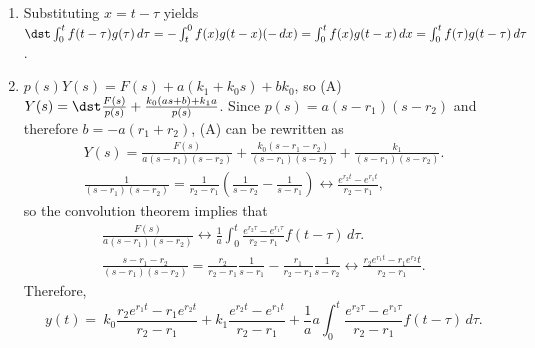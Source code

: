 \documentclass[openany]{book}
\newenvironment{sectionSolutions}{
 \begin{enumerate}[item-label={\thesection.\arabic{enumi}.}]
}{
 \end{enumerate}
}
\begin{document}
\begin{sectionSolutions}

\item Substituting $x=t-\tau$ yields
$\dst\int_0^tf(t-\tau)g(\tau)\,d\tau=-\int_t^0f(x)g(t-x)(-\,dx)=
\int_0^tf(x)g(t-x)\,dx=\int_0^tf(\tau)g(t-\tau)\,d\tau$.


\item
$p(s)Y(s)=F(s)+a(k_1+k_0s)+bk_0$, so
(A) $Y(s)=\dst\frac{F(s)}{ p(s)}+\frac{k_0(as+b)+k_1a}{ p(s)}$.
Since $p(s)=a(s-r_1)(s-r_2)$ and therefore $b=-a(r_1+r_2)$,
(A) can be rewritten as
\begin{gather*}
Y(s)=\frac{F(s)}{ a(s-r_1)(s-r_2)}+\frac{k_0(s-r_1-r_2)}{(s-r_1)(s-r_2)}
+\frac{k_1}{(s-r_1)(s-r_2)}.
\\
\frac{1}{(s-r_1)(s-r_2)}=\frac{1}{ r_2-r_1}\left(\frac{1}{ s-r_2}
-\frac{1}{ s-r_1}\right)\leftrightarrow\frac{e^{r_2t}-e^{r_1t}}{
r_2-r_1},
\end{gather*}
so the convolution theorem implies that
\begin{gather*}
\frac{F(s)}{ a(s-r_1)(s-r_2)}\leftrightarrow
\frac{1}{
a}\int_0^t\frac{e^{r_2\tau}-e^{r_1\tau}}{ r_2-r_1}f(t-\tau)\,d\tau.
\\
\frac{s-r_1-r_2}{(s-r_1)(s-r_2)}=\frac{r_2}{ r_2-r_1}\frac{1}{ s-r_1}
-\frac{r_1}{ r_2-r_1}\frac{1}{ s-r_2}\leftrightarrow
\frac{r_2e^{r_1t}-r_1e^{r_2}t}{ r_2-r_1}.
\end{gather*}
Therefore,
\[
y(t)=\ k_0\frac{r_2e^{r_1t}-r_1e^{r_2t}}{ r_2-r_1}+k_1\frac{e^{r_2t}-e^{r_1t}
}{ r_2-r_1}
+\frac{1}{ a}
a\int_0^t\frac{e^{r_2\tau}-e^{r_1\tau}}{ r_2-r_1}f(t-\tau)\,d\tau.
\]



\end{sectionSolutions}
\end{document}
